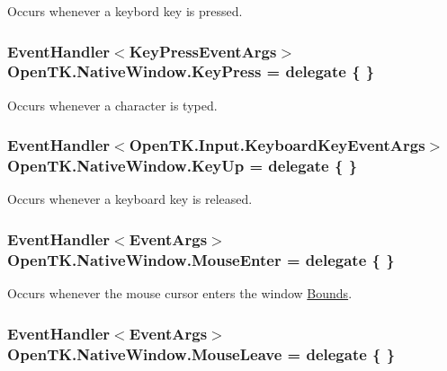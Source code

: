 Occurs whenever a keybord key is pressed. 

\hypertarget{class_open_t_k_1_1_native_window_a77b59f8d65f596bdabc4f199dfa1dc0e}{
\subsubsection[{Key\-Press}]{\setlength{\rightskip}{0pt plus 5cm}Event\-Handler$<${\bf Key\-Press\-Event\-Args}$>$ Open\-T\-K.\-Native\-Window.\-Key\-Press = delegate \{ \}}}\label{class_open_t_k_1_1_native_window_a77b59f8d65f596bdabc4f199dfa1dc0e}


Occurs whenever a character is typed. 

\hypertarget{class_open_t_k_1_1_native_window_ab124b92a7dc7bec0d6a752b15103e36d}{
\subsubsection[{Key\-Up}]{\setlength{\rightskip}{0pt plus 5cm}Event\-Handler$<${\bf Open\-T\-K.\-Input.\-Keyboard\-Key\-Event\-Args}$>$ Open\-T\-K.\-Native\-Window.\-Key\-Up = delegate \{ \}}}\label{class_open_t_k_1_1_native_window_ab124b92a7dc7bec0d6a752b15103e36d}


Occurs whenever a keyboard key is released. 

\hypertarget{class_open_t_k_1_1_native_window_a04e101987663c30051ae857f7b440f52}{
\subsubsection[{Mouse\-Enter}]{\setlength{\rightskip}{0pt plus 5cm}Event\-Handler$<$Event\-Args$>$ Open\-T\-K.\-Native\-Window.\-Mouse\-Enter = delegate \{ \}}}\label{class_open_t_k_1_1_native_window_a04e101987663c30051ae857f7b440f52}


Occurs whenever the mouse cursor enters the window \hyperlink{class_open_t_k_1_1_native_window_ac0325973134062eba62484df45236464}{Bounds}. 

\hypertarget{class_open_t_k_1_1_native_window_aa1f74c551b636689078e31d72627e856}{
\subsubsection[{Mouse\-Leave}]{\setlength{\rightskip}{0pt plus 5cm}Event\-Handler$<$Event\-Args$>$ Open\-T\-K.\-Native\-Window.\-Mouse\-Leave = delegate \{ \}}}\label{class_open_t_k_1_1_native_window_aa1f74c551b636689078e31d72627e856}


